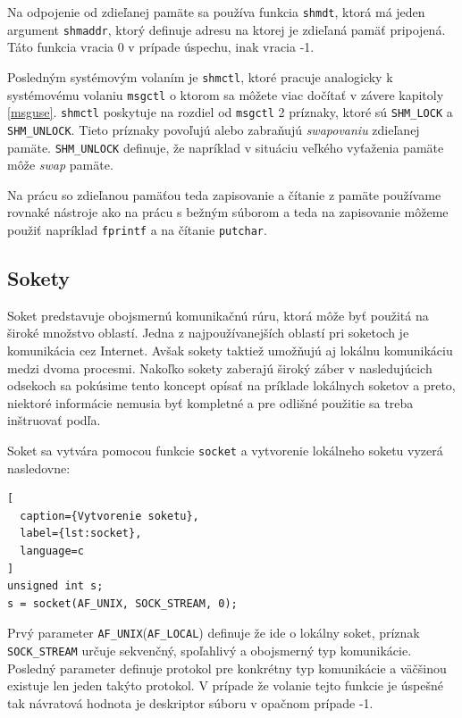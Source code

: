 Na odpojenie od zdieľanej pamäte sa používa funkcia \texttt{shmdt}, ktorá má jeden argument \texttt{shmaddr}, ktorý definuje adresu na ktorej je zdieľaná pamäť pripojená. Táto funkcia vracia 0 v prípade úspechu, inak vracia -1.

Posledným systémovým volaním je \texttt{shmctl}, ktoré pracuje analogicky k systémovému volaniu \texttt{msgctl} o ktorom sa môžete viac dočítať v závere kapitoly \ref{msguse}. \texttt{shmctl} poskytuje na rozdiel od \texttt{msgctl} 2 príznaky, ktoré sú \texttt{SHM\_LOCK} a \texttt{SHM\_UNLOCK}. Tieto príznaky povoľujú alebo zabraňujú \textit{swapovaniu} zdieľanej pamäte. \texttt{SHM\_UNLOCK} definuje, že napríklad v situáciu veľkého vyťaženia pamäte môže \textit{swap} pamäte.\cite{shmctl}

Na prácu so zdieľanou pamäťou teda zapisovanie a čítanie z pamäte používame rovnaké nástroje ako na prácu s bežným súborom a teda na zapisovanie môžeme použiť napríklad \texttt{fprintf} a na čítanie \texttt{putchar}.
\subsection{Sokety}
Soket predstavuje obojsmernú komunikačnú rúru, ktorá môže byť použitá na široké množstvo oblastí. Jedna z najpoužívanejších oblastí pri soketoch je komunikácia cez Internet. Avšak sokety taktiež umožňujú aj lokálnu komunikáciu medzi dvoma procesmi.\cite{beej} Nakoľko sokety zaberajú široký záber v nasledujúcich odsekoch sa pokúsime tento koncept opísať na príklade lokálnych soketov a preto, niektoré informácie nemusia byť kompletné a pre odlišné použitie sa treba inštruovať podľa\cite{socket}.

Soket sa vytvára pomocou funkcie \texttt{socket} a vytvorenie lokálneho soketu vyzerá nasledovne:
\begin{lstlisting}[
  caption={Vytvorenie soketu},
  label={lst:socket},
  language=c
]
unsigned int s;
s = socket(AF_UNIX, SOCK_STREAM, 0);
\end{lstlisting}
Prvý parameter \texttt{AF\_UNIX}(\texttt{AF\_LOCAL}) definuje že ide o lokálny soket, príznak \texttt{SOCK\_STREAM} určuje sekvenčný, spoľahlivý a obojsmerný typ komunikácie. Posledný parameter definuje protokol pre konkrétny typ komunikácie a väčšinou existuje len jeden takýto protokol. V prípade že volanie tejto funkcie je úspešné tak návratová hodnota je deskriptor súboru v opačnom prípade -1. 


